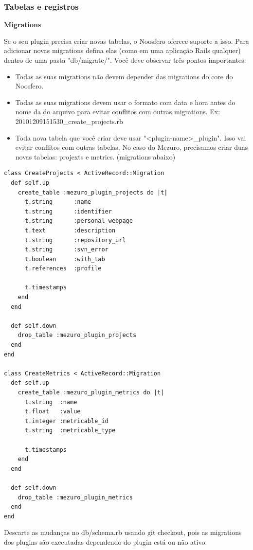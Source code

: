 \documentclass[11pt]{article}
\begin{document}
\subsubsection{Tabelas e registros}

{\bf Migrations}

Se o seu plugin precisa criar novas tabelas, o Noosfero oferece suporte a
isso. Para adicionar novas migrations defina elas (como em uma aplicação Rails
qualquer) dentro de uma pasta "db/migrate/". Você deve observar três pontos
importantes:

\begin{itemize}
  \item Todas as suas migrations não devem depender das migrations do core do
    Noosfero.
  \item Todas as suas migrations devem usar o formato com data e hora antes do
    nome da do arquivo para evitar conflitos com outras migrations. Ex:
    20101209151530\_create\_projects.rb
  \item Toda nova tabela que você criar deve usar "<plugin-name>\_plugin".
    Isso vai evitar conflitos com outras tabelas. No caso do Mezuro,
    precisamos criar duas novas tabelas: projexts e metrics. (migrations
    abaixo)
\end{itemize}

\begin{Verbatim}[frame=single,fontfamily=courier]
class CreateProjects < ActiveRecord::Migration
  def self.up
    create_table :mezuro_plugin_projects do |t|
      t.string      :name
      t.string      :identifier
      t.string      :personal_webpage
      t.text        :description
      t.string      :repository_url
      t.string      :svn_error
      t.boolean     :with_tab
      t.references  :profile
 
      t.timestamps
    end
  end
 
  def self.down
    drop_table :mezuro_plugin_projects
  end
end

class CreateMetrics < ActiveRecord::Migration
  def self.up
    create_table :mezuro_plugin_metrics do |t|
      t.string  :name
      t.float   :value
      t.integer :metricable_id
      t.string  :metricable_type
 
      t.timestamps
    end
  end
 
  def self.down
    drop_table :mezuro_plugin_metrics
  end
end
\end{Verbatim}

Descarte as mudanças no db/schema.rb usando git checkout, pois as migrations
dos plugins são executadas dependendo do plugin está ou não ativo.
\end{document}
